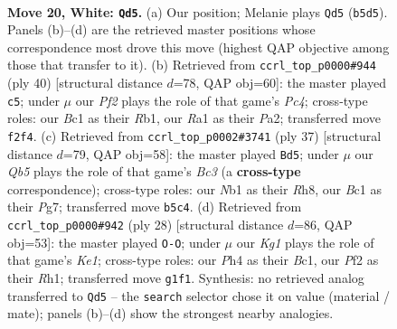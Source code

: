 \documentclass[11pt]{article}
\begin{document}
\clearpage

\begin{figure}[p]\centering
\begin{subfigure}{0.46\textwidth}\centering
\resizebox{\linewidth}{!}{%
\newchessgame
\chessboard[
  setfen={r1b2b1r/2q1k1pp/1p6/pQ2p3/3p3P/8/PP3PP1/RNB1R1K1 w - - 2 20},
  showmover=false,
  pgfstyle=straightmove, color=movearrow, markmove={b5-d5}
]}
\caption{}
\end{subfigure}\hfill
\begin{subfigure}{0.46\textwidth}\centering
\resizebox{\linewidth}{!}{%
\newchessgame
\chessboard[
  setfen={r1b1k2r/1p2bqpp/p3p3/4Qp2/2P5/3BB3/P4PPP/1R1R2K1 w kq - 1 21},
  showmover=false,
  pgfstyle=straightmove, color=movearrow, markmove={c4-c5}
]}
\caption{}
\end{subfigure}
\\[4pt]
\begin{subfigure}{0.46\textwidth}\centering
\resizebox{\linewidth}{!}{%
\newchessgame
\chessboard[
  setfen={r3k2r/5pp1/pBb1p2p/8/1b3qP1/5P2/1PP2Q1P/1K1R1BR1 b kq - 3 19},
  showmover=false,
  pgfstyle=straightmove, color=movearrow, markmove={c6-d5}
]}
\caption{}
\end{subfigure}\hfill
\begin{subfigure}{0.46\textwidth}\centering
\resizebox{\linewidth}{!}{%
\newchessgame
\chessboard[
  setfen={r1b1kb1r/p4pp1/2q1p2p/8/1ppQP3/8/PP2BPPP/R1B1K2R w KQkq - 0 15},
  showmover=false,
  pgfstyle=straightmove, color=movearrow, markmove={e1-g1}
]}
\caption{}
\end{subfigure}
\caption{\textbf{Move 20, White: \texttt{Qd5}.} (a) Our position; Melanie plays \texttt{Qd5} (\texttt{b5d5}). Panels (b)--(d) are the retrieved master positions whose correspondence most drove this move (highest QAP objective among those that transfer to it). (b) Retrieved from \texttt{ccrl\_top\_p0000\#944} (ply 40) [structural distance $d$=78, QAP obj=60]: the master played \texttt{c5}; under $\mu$ our \emph{Pf2} plays the role of that game's \emph{Pc4}; cross-type roles: our \emph{B}c1 as their \emph{R}b1, our \emph{R}a1 as their \emph{P}a2; transferred move \texttt{f2f4}. (c) Retrieved from \texttt{ccrl\_top\_p0002\#3741} (ply 37) [structural distance $d$=79, QAP obj=58]: the master played \texttt{Bd5}; under $\mu$ our \emph{Qb5} plays the role of that game's \emph{Bc3} (a \textbf{cross-type} correspondence); cross-type roles: our \emph{N}b1 as their \emph{R}h8, our \emph{B}c1 as their \emph{P}g7; transferred move \texttt{b5c4}. (d) Retrieved from \texttt{ccrl\_top\_p0000\#942} (ply 28) [structural distance $d$=86, QAP obj=53]: the master played \texttt{O-O}; under $\mu$ our \emph{Kg1} plays the role of that game's \emph{Ke1}; cross-type roles: our \emph{P}h4 as their \emph{B}c1, our \emph{P}f2 as their \emph{R}h1; transferred move \texttt{g1f1}. Synthesis: no retrieved analog transferred to \texttt{Qd5} -- the \texttt{search} selector chose it on value (material / mate); panels (b)--(d) show the strongest nearby analogies.}
\label{fig:thought-m38}
\end{figure}
\end{document}
